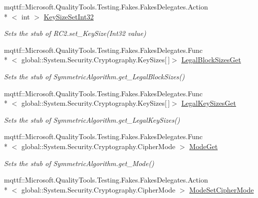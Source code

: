 \begin{DoxyCompactItemize}
mqttf\-::\-Microsoft.\-Quality\-Tools.\-Testing.\-Fakes.\-Fakes\-Delegates.\-Action\\*
$<$ int $>$ \hyperlink{class_system_1_1_security_1_1_cryptography_1_1_fakes_1_1_stub_r_c2_a67040539777a840710f902fd028ae3db}{Key\-Size\-Set\-Int32}
\begin{DoxyCompactList}\small\item\em Sets the stub of R\-C2.\-set\-\_\-\-Key\-Size(\-Int32 value)\end{DoxyCompactList}\item 
mqttf\-::\-Microsoft.\-Quality\-Tools.\-Testing.\-Fakes.\-Fakes\-Delegates.\-Func\\*
$<$ global\-::\-System.\-Security.\-Cryptography.\-Key\-Sizes\mbox{[}$\,$\mbox{]}$>$ \hyperlink{class_system_1_1_security_1_1_cryptography_1_1_fakes_1_1_stub_r_c2_a2c6a1058ade405c402e6e4df28d983c1}{Legal\-Block\-Sizes\-Get}
\begin{DoxyCompactList}\small\item\em Sets the stub of Symmetric\-Algorithm.\-get\-\_\-\-Legal\-Block\-Sizes()\end{DoxyCompactList}\item 
mqttf\-::\-Microsoft.\-Quality\-Tools.\-Testing.\-Fakes.\-Fakes\-Delegates.\-Func\\*
$<$ global\-::\-System.\-Security.\-Cryptography.\-Key\-Sizes\mbox{[}$\,$\mbox{]}$>$ \hyperlink{class_system_1_1_security_1_1_cryptography_1_1_fakes_1_1_stub_r_c2_a7342ab654d3593d1519c829bb98c1755}{Legal\-Key\-Sizes\-Get}
\begin{DoxyCompactList}\small\item\em Sets the stub of Symmetric\-Algorithm.\-get\-\_\-\-Legal\-Key\-Sizes()\end{DoxyCompactList}\item 
mqttf\-::\-Microsoft.\-Quality\-Tools.\-Testing.\-Fakes.\-Fakes\-Delegates.\-Func\\*
$<$ global\-::\-System.\-Security.\-Cryptography.\-Cipher\-Mode $>$ \hyperlink{class_system_1_1_security_1_1_cryptography_1_1_fakes_1_1_stub_r_c2_ae8aedea3347e49bbedb49d553a331cf5}{Mode\-Get}
\begin{DoxyCompactList}\small\item\em Sets the stub of Symmetric\-Algorithm.\-get\-\_\-\-Mode()\end{DoxyCompactList}\item 
mqttf\-::\-Microsoft.\-Quality\-Tools.\-Testing.\-Fakes.\-Fakes\-Delegates.\-Action\\*
$<$ global\-::\-System.\-Security.\-Cryptography.\-Cipher\-Mode $>$ \hyperlink{class_system_1_1_security_1_1_cryptography_1_1_fakes_1_1_stub_r_c2_a43b196ac0eda524ec39e26b904a9ccfe}{Mode\-Set\-Cipher\-Mode}

\end{DoxyCompactItemize}
